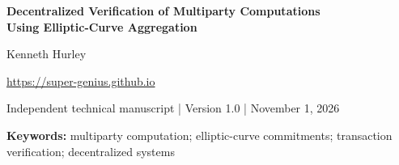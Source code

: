 \documentclass[10pt,letterpaper]{article}
\begin{document}
\begin{center}
{\Large\bfseries Decentralized Verification of Multiparty Computations\\Using Elliptic-Curve Aggregation\par}
\vspace{7pt}
{\normalsize Kenneth Hurley\par}
\vspace{2pt}
{\small \url{https://super-genius.github.io}\par}
\vspace{4pt}
{\footnotesize Independent technical manuscript \quad | \quad Version 1.0 \quad | \quad November 1, 2026}
\end{center}
\begin{abstract}
Decentralized systems must determine whether a collection of participants has produced a valid result without necessarily disclosing each participant's input. This paper describes a proposed verification architecture built around a requestor, elliptic-curve aggregates, and a circuit-oriented transaction validator. It gives the relations checked by a supplied C++ prototype, distinguishes group arithmetic from a complete zero-knowledge proof, and identifies the conditions required for private, independently verifiable execution. The design supports a broader goal of checking distributed transaction or compute results at network boundaries. The accompanying source is a prototype; this paper does not report a production deployment, cryptographic security proof, or performance benchmark.
\end{abstract}
\vspace{3pt}
\noindent\textbf{Keywords:} multiparty computation; elliptic-curve commitments; transaction verification; decentralized systems
\vspace{15pt}
\end{document}

